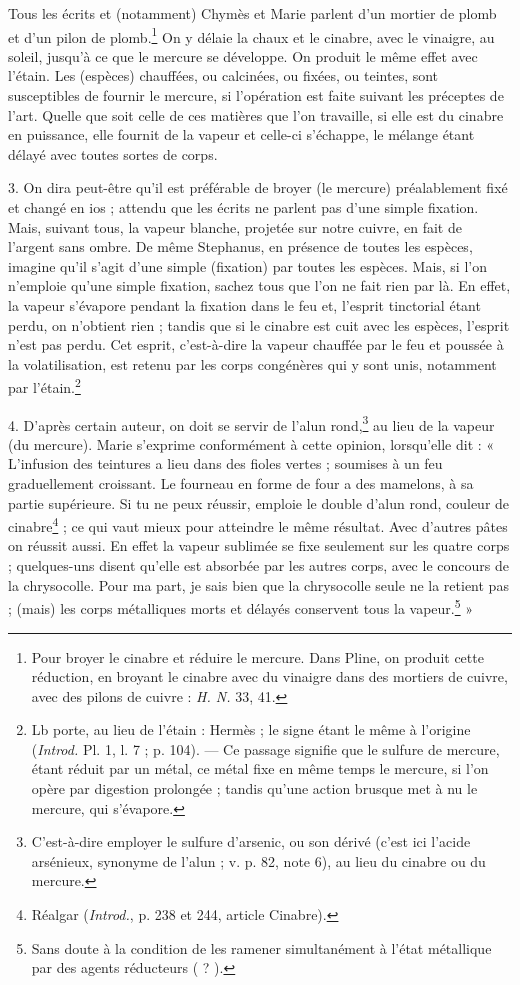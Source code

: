\documentclass[a4paper, 11pt, oneside, polutonikogreek, french]{article}
\begin{document}
Tous les écrits et (notamment) Chymès et Marie parlent d'un mortier de plomb et d'un pilon de plomb.\footnote{Pour broyer le cinabre et réduire le mercure. Dans Pline, on produit cette réduction, en broyant le cinabre avec du vinaigre dans des mortiers de cuivre, avec des pilons de cuivre : \emph{H. N.} 33, 41.} On y délaie la chaux et le cinabre, avec le vinaigre, au soleil, jusqu'à ce que le mercure se développe. On produit le même effet avec l'étain. Les (espèces) chauffées, ou calcinées, ou fixées, ou teintes, sont susceptibles de fournir le mercure, si l'opération est faite suivant les préceptes de l'art. Quelle que soit celle de ces matières que l'on travaille, si elle est du cinabre en puissance, elle fournit de la vapeur et celle-ci s'échappe, le mélange étant délayé avec toutes sortes de corps.

3. On dira peut-être qu'il est préférable de broyer (le mercure) préalablement fixé et changé en ios ; attendu que les écrits ne parlent pas d'une simple fixation. Mais, suivant tous, la vapeur blanche, projetée sur notre cuivre, en fait de l'argent sans ombre. De même Stephanus, en présence de toutes les espèces, imagine qu'il s'agit d'une simple (fixation) par toutes les espèces. Mais, si l'on n'emploie qu'une simple fixation, sachez tous que l'on ne fait rien par là. En effet, la vapeur s'évapore pendant la fixation dans le feu et, l'esprit tinctorial étant perdu, on n'obtient rien ; tandis que si le cinabre est cuit avec les espèces, l'esprit n'est pas perdu. Cet esprit, c'est-à-dire la vapeur chauffée par le feu et poussée à la volatilisation, est retenu par les corps congénères qui y sont unis, notamment par l'étain.\footnote{Lb porte, au lieu de l'étain : Hermès ; le signe étant le même à l'origine (\emph{Introd.} Pl. 1, l. 7 ; p. 104). --- Ce passage signifie que le sulfure de mercure, étant réduit par un métal, ce métal fixe en même temps le mercure, si l'on opère par digestion prolongée ; tandis qu'une action brusque met à nu le mercure, qui s'évapore.}

4. D'après certain auteur, on doit se servir de l'alun rond,\footnote{C'est-à-dire employer le sulfure d'arsenic, ou son dérivé (c'est ici l'acide arsénieux, synonyme de l'alun ; v. p. 82, note 6), au lieu du cinabre ou du mercure.} au lieu de la vapeur (du mercure). Marie s'exprime conformément à cette opinion, lorsqu'elle dit : « L'infusion des teintures a lieu dans des fioles vertes ; soumises à un feu graduellement croissant. Le fourneau en forme de four a des mamelons, à sa partie supérieure. Si tu ne peux réussir, emploie le double d'alun rond, couleur de cinabre\footnote{Réalgar (\emph{Introd.}, p. 238 et 244, article Cinabre).} ; ce qui vaut mieux pour atteindre le même résultat. Avec d'autres pâtes on réussit aussi. En effet la vapeur sublimée se fixe seulement sur les quatre corps ; quelques-uns disent qu'elle est absorbée par les autres corps, avec le concours de la chrysocolle. Pour ma part, je sais bien que la chrysocolle seule ne la retient pas ; (mais) les corps métalliques morts et délayés conservent tous la vapeur.\footnote{Sans doute à la condition de les ramener simultanément à l'état métallique par des agents réducteurs ( ? ).} »
\end{document}
